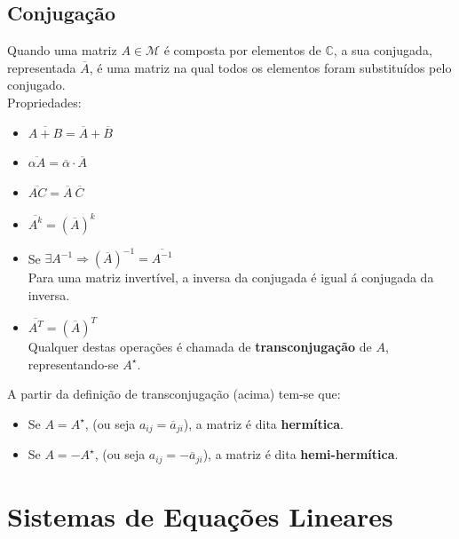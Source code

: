 \documentclass[]{report}
\begin{document}
\section{Conjugação}
Quando uma matriz $A \in \mathcal{M}$ é composta por elementos de $\mathbb{C}$, a sua conjugada, representada $\overline{A}$, é uma matriz na qual todos os elementos foram substituídos pelo conjugado.\\
Propriedades:
\begin{itemize}
\item $\overline{A+B} = \overline A + \overline B$
\item $\overline{\alpha A} = \overline \alpha \cdot \overline A$
\item $\overline{AC} = \overline A  \> \overline C$
\item $\overline{A^k} = (\overline{A})^k$
\item Se $\exists A^{-1} \Rightarrow  (\overline{A})^{-1} = \overline{A^{-1}}$\\
Para uma matriz invertível, a inversa da conjugada é igual á conjugada da inversa.
\item $\overline{A^T} = (\overline{A})^T$\\
Qualquer destas operações é chamada de \textbf{transconjugação} de $A$, representando-se $A^\star$.
\end{itemize}
A partir da definição de transconjugação (acima) tem-se que:
\begin{itemize}
\item Se $A = A^\star$, (ou seja $a_{ij} = \overline{a}_{ji}$), a matriz é dita \textbf{hermítica}.
\item Se $A = -A^\star$, (ou seja $a_{ij} = -\overline{a}_{ji}$), a matriz é dita \textbf{hemi-hermítica}.
\end{itemize}
\chapter{Sistemas de Equações Lineares}
\end{document}
